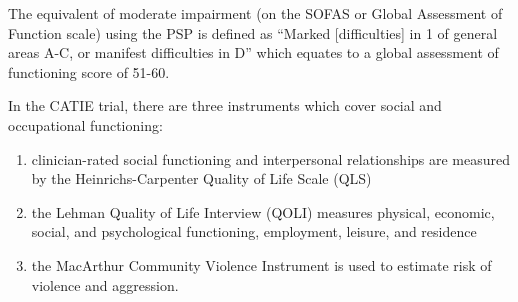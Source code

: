 \documentclass[a4paper,nobib]{article}
\begin{document}
The equivalent of moderate impairment (on the SOFAS or Global Assessment of Function scale) using the PSP \citep{Morosini2000} is defined as ``Marked [difficulties] in 1 of general areas A-C, or manifest difficulties in D'' which equates to a global assessment of functioning score of 51-60.  

In the CATIE trial, there are three instruments which cover social and occupational functioning:
\begin{enumerate}
	\item clinician-rated social functioning and interpersonal relationships are measured by the Heinrichs-Carpenter Quality of Life Scale (QLS) \citep{heinrichs1984quality}
	\item the Lehman Quality of Life Interview (QOLI) measures physical, economic, social, and psychological functioning, employment, leisure, and residence \cite{lehman1988quality}
	\item the MacArthur Community Violence Instrument \citep{steadman1998violence} is used to estimate risk of violence and aggression. 
\end{enumerate}
\end{document}
